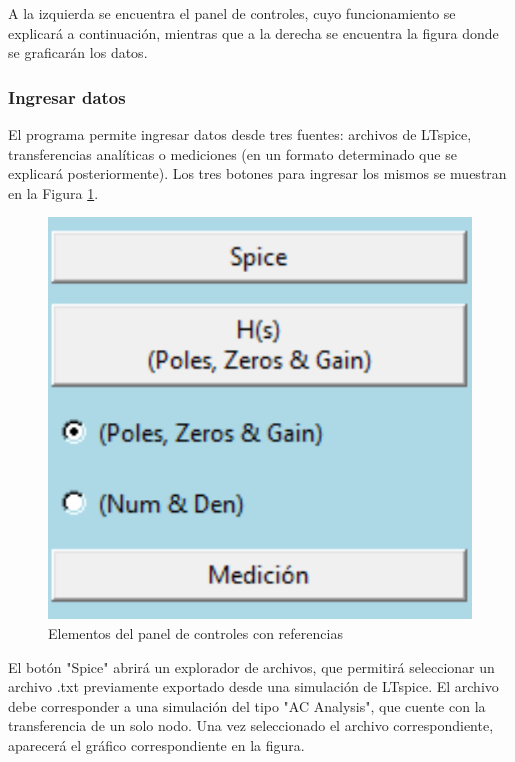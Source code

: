 A la izquierda se encuentra el panel de controles, cuyo funcionamiento se explicará a continuación, mientras que a la derecha se encuentra la figura donde se graficarán los datos.


\subsubsection{Ingresar datos}
El programa permite ingresar datos desde tres fuentes: archivos de LTspice, transferencias analíticas o mediciones (en un formato determinado que se explicará posteriormente). Los tres botones para ingresar los mismos se muestran en la Figura \ref{fig:inputControls}.

\begin{figure}[ht]
\centering
\includegraphics[scale=0.3]{resources/inputControls.png}
\caption{Elementos del panel de controles con referencias}
\label{fig:inputControls}
\end{figure}

El botón "Spice" abrirá un explorador de archivos, que permitirá seleccionar un archivo .txt previamente exportado desde una simulación de LTspice. El archivo debe corresponder a una simulación del tipo "AC Analysis", que cuente con la transferencia de un solo nodo. Una vez seleccionado el archivo correspondiente, aparecerá el gráfico correspondiente en la figura.


